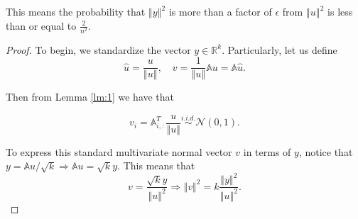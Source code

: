 \documentclass{article}
\begin{document}
This means the probability that $\left\Vert y \right\Vert^2$ is more than a factor of $\epsilon$ from $\left\Vert u \right\Vert^2$ is less than or equal to $\frac{2}{n^2}$.

\begin{proof}

To begin, we standardize the vector $y \in \mathbb{R}^k$. Particularly, let us define
$$ \hat{u} = \frac{u}{\left\Vert u \right\Vert}, \quad v = \frac{1}{\left\Vert u \right\Vert}\mathbb{A}u = \mathbb{A} \hat{u}.$$

Then from Lemma \ref{lm:1} we have that

$$ v_i =  \mathbb{A}_{i,:}^T \frac{u}{\left\Vert u \right\Vert} \overset{i.i.d.}{\sim} \mathcal{N}(0, 1).$$

To express this standard multivariate normal vector $v$ in terms of $y$, notice that $y = \mathbb{A}u/\sqrt{k} \Rightarrow \mathbb{A}u = \sqrt{k}y$. This means that
$$ v = \frac{\sqrt{k}y}{\left\Vert u \right\Vert^2} \Rightarrow \left\Vert v \right\Vert^2 = k \frac{\left\Vert y \right\Vert^2}{\left\Vert u \right\Vert^2}.$$


\end{proof}
\end{document}
